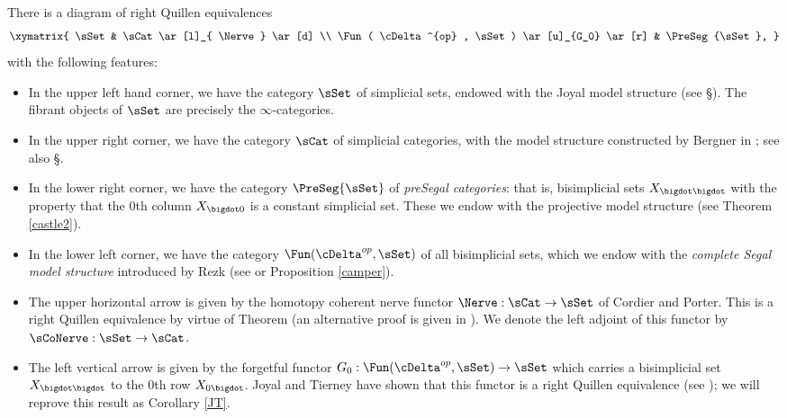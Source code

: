 \begin{theorem}\label{onever}
There is a diagram of right Quillen equivalences
$$ \xymatrix{ \sSet & \sCat \ar[l]_{ \Nerve } \ar[d] \\
\Fun( \cDelta^{op} , \sSet) \ar[u]_{G_0} \ar[r] & \PreSeg{\sSet}, }$$
with the following features:

\begin{itemize}
\item[$(A1)$] In the upper left hand corner, we have the category $\sSet$ of simplicial sets,
endowed with the Joyal model structure (see \S {}).
The fibrant objects of $\sSet$ are precisely the $\infty$-categories.

\item[$(A2)$] In the upper right corner, we have the category $\sCat$ of simplicial categories,
with the model structure constructed by Bergner in \cite{bergner}; see also
\S {}.

\item[$(A3)$] In the lower right corner, we have the category $\PreSeg{\sSet}$ of
{\it preSegal categories}: that is, bisimplicial sets $X_{\bigdot \bigdot}$ with
the property that the $0$th column $X_{\bigdot 0}$ is a constant simplicial set.
These we endow with the projective model structure (see Theorem \ref{castle2}).

\item[$(A4)$] In the lower left corner, we have the category $\Fun( \cDelta^{op}, \sSet)$ of 
all bisimplicial sets, which we endow with the {\it complete Segal model structure}
introduced by Rezk (see \cite{completesegal} or Proposition \ref{camper}).

\item[$(B1)$] The upper horizontal arrow is given by the homotopy coherent nerve
functor $\Nerve: \sCat \rightarrow \sSet$ of Cordier and Porter. This 
is a right Quillen equivalence by virtue of Theorem 
(an alternative proof is given in \cite{joyalsimp}). We denote the left adjoint of this
functor by $\sCoNerve: \sSet \rightarrow \sCat$.

\item[$(B2)$] The left vertical arrow is given by the forgetful functor 
$G_0: \Fun( \cDelta^{op}, \sSet) \rightarrow \sSet$ which carries
a bisimplicial set $X_{\bigdot \bigdot}$ to the $0$th row
$X_{0 \bigdot}$. Joyal and Tierney have shown that this functor is a right Quillen equivalence
(see \cite{joyalt}); we will reprove this result as Corollary \ref{JT}.


\end{itemize}
\end{theorem}
